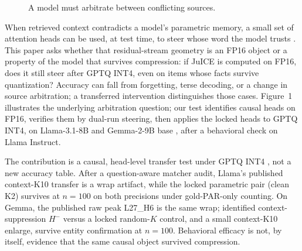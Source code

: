 \documentclass{article} %
\begin{document}
\begin{figure}
\vspace{-6pt}
\centering
{}
\caption{\footnotesize A model must arbitrate between conflicting sources.}
\vspace{-5pt}
\end{figure}

When retrieved context contradicts a model's parametric memory, a small set of attention heads can be used, at test time, to steer whose word the model trusts \citep{li2025taming}. This paper asks whether that residual-stream geometry is an FP16 object or a property of the model that survives compression: if JuICE is computed on FP16, does it still steer after GPTQ INT4, even on items whose facts survive quantization? Accuracy can fall from forgetting, terse decoding, or a change in source arbitration; a transferred intervention distinguishes those cases. Figure~1 illustrates the underlying arbitration question; our test identifies causal heads on FP16, verifies them by dual-run steering, then applies the locked heads to GPTQ INT4, on Llama-3.1-8B and Gemma-2-9B base \citep{grattafiori2024llama,team2024gemma2}, after a behavioral check on Llama Instruct.

The contribution is a causal, head-level transfer test under GPTQ INT4 \citep{frantar2023gptq}, not a new accuracy table. After a question-aware matcher audit, Llama's published context-K10 transfer is a wrap artifact, while the locked parametric pair (clean K2) survives at $n{=}100$ on both precisions under gold-PAR-only counting. On Gemma, the published raw peak L27\_H6 is the same wrap; identified context-suppression $H^{-}$ versus a locked random-$K$ control, and a small context-K10 enlarge, survive entity confirmation at $n{=}100$. Behavioral efficacy is not, by itself, evidence that the same causal object survived compression.
\end{document}
